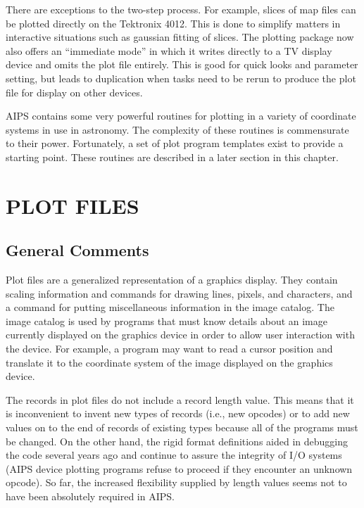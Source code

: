 There are exceptions to the two-step process.  For example, slices of
map files can be plotted directly on the Tektronix 4012.  This is
done to simplify matters in interactive situations such as gaussian
fitting of slices.  The plotting package now also offers an ``immediate
mode'' in which it writes directly to a TV display device and omits
the plot file entirely.  This is good for quick looks and parameter
setting, but leads to duplication when tasks need to be rerun to
produce the plot file for display on other devices.

AIPS contains some very powerful routines for plotting in a variety of
coordinate systems in use in astronomy.  The complexity of these
routines is commensurate to their power.  Fortunately, a set of plot
program templates exist to provide a starting point.  These routines
are described in a later section in this chapter.

\section{PLOT FILES}
\subsection{General Comments}

Plot files are a generalized representation of a
graphics display.  They contain scaling information and commands for
drawing lines, pixels, and characters, and a command for putting
miscellaneous information in the image catalog.  The image catalog is
used by programs that must know details about an image currently
displayed on the graphics device in order to allow user interaction with
the device.  For example, a program may want to read a cursor position and
translate it to the coordinate system of the image displayed on the
graphics device.

The records in plot files do not include a record length value. This
means that it is inconvenient to invent new types of records (i.e.,
new opcodes) or to add new values on to the end of records of existing
types because all of the programs must be changed. On the other hand,
the rigid format definitions aided in debugging the code several years
ago and continue to assure the integrity of I/O systems (AIPS device
plotting programs refuse to proceed if they encounter an unknown
opcode). So far, the increased flexibility supplied by length values
seems not to have been absolutely required in AIPS.

